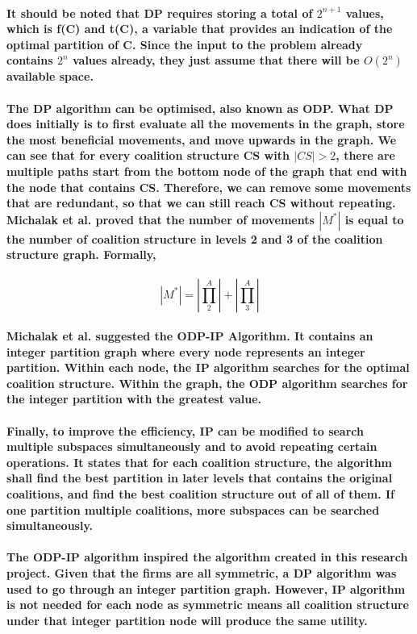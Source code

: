 \documentclass[11pt]{report}
\begin{document}
\paragraph{It should be noted that DP requires storing a total of $2^{n+1}$ values, which is f(C) and t(C), a variable that provides an indication of the optimal partition of C. Since the input to the problem already contains $2^n$ values already, they just assume that there will be $O(2^n)$ available space. }

\paragraph{The DP algorithm can be optimised, also known as ODP. What DP does initially is to first evaluate all the movements in the graph, store the most beneficial movements, and move upwards in the graph. We can see that for every coalition structure CS with $|CS|>2$, there are multiple paths start from the bottom node of the graph that end with the node that contains CS. Therefore, we can remove some movements that are redundant, so that we can still reach CS without repeating. Michalak et al. proved that the number of movements $|M^*|$ is equal to the number of coalition structure in levels 2 and 3 of the coalition structure graph. Formally, }
\[|M^*|=|\prod_2^A|+|\prod_3^A|\]

\paragraph{Michalak et al. \cite{michalak2016hybrid} suggested the ODP-IP Algorithm. It contains an integer partition graph where every node represents an integer partition. Within each node, the IP algorithm searches for the optimal coalition structure. Within the graph, the ODP algorithm searches for the integer partition with the greatest value. }
\paragraph{Finally, to improve the efficiency, IP can be modified to search multiple subspaces simultaneously and to avoid repeating certain operations. It states that for each coalition structure, the algorithm shall find the best partition in later levels that contains the original coalitions, and find the best coalition structure out of all of them. If one partition multiple coalitions, more subspaces can be searched simultaneously.}

\paragraph{The ODP-IP algorithm inspired the algorithm created in this research project. Given that the firms are all symmetric, a DP algorithm was used to go through an integer partition graph. However, IP algorithm is not needed for each node as symmetric means all coalition structure under that integer partition node will produce the same utility. }
\end{document}
